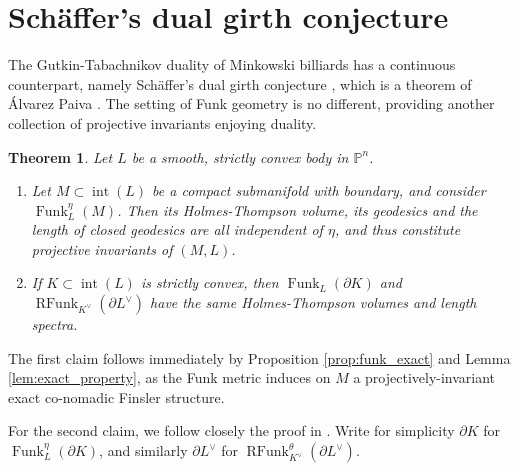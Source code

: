 \documentclass[reqno,10pt]{amsart}
\newcommand{\blue}{}
\newcounter{mp}
\newtheorem{Theorem}[Proposition]{Theorem}
\DeclareMathOperator{\inter}{int}
\DeclareMathOperator{\Funk}{Funk}
\DeclareMathOperator{\RFunk}{RFunk}
\newcommand{\PP}{\mathbb{P}}
\begin{document}
\section{Sch\"affer's dual girth conjecture}\label{sec:girth}

The Gutkin-Tabachnikov duality of Minkowski billiards has a continuous counterpart, namely Sch\"affer's dual girth conjecture \cite{schaeffer}, which is a theorem of \'Alvarez Paiva \cite{alvarez-paiva}. The setting of Funk geometry is no different, providing another collection of projective invariants enjoying duality.
{\blue 
\begin{Theorem}\label{thm:girth}
Let $L$ be a smooth, strictly convex body in $\PP^n$. 
\begin{enumerate}
	\item Let $M\subset\inter(L)$ be a compact submanifold with boundary, and consider $\Funk^\eta_L(M)$. Then its Holmes-Thompson volume, its geodesics and the length of closed geodesics are all independent of $\eta$, and thus constitute projective invariants of $(M,L)$.
	\item  If $K\subset\inter(L)$ is strictly convex, then $\Funk_L(\partial K)$ and $\RFunk_{K^\vee}(\partial L^\vee)$ have the same Holmes-Thompson volumes and length spectra.
\end{enumerate}
\end{Theorem}
\proof
The first claim follows immediately by Proposition \ref{prop:funk_exact} and Lemma \ref{lem:exact_property}, as the Funk metric induces on $M$ a projectively-invariant exact co-nomadic Finsler structure.

For the second claim, we follow closely the proof in \cite{alvarez-paiva}. Write for simplicity $\partial K$ for $\Funk^\eta_L(\partial K)$, and similarly  $\partial L^\vee$ for $\RFunk^\theta_{K^\vee}(\partial L^\vee)$. 


}
\end{document}

